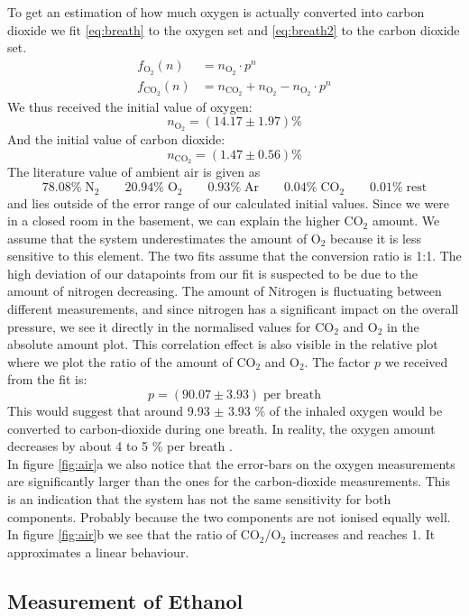     
    To get an estimation of how much oxygen is actually converted into carbon dioxide we fit \eqref{eq:breath} to the oxygen set and \eqref{eq:breath2} to the carbon dioxide set.
    \begin{align}
        f_{\text{O}_2}(n) &= n_{\text{O}_2} \cdot p^n \label{eq:breath}\\
        f_{\text{CO}_2}(n) &= n_{\text{CO}_2} +  n_{\text{O}_2} - n_{\text{O}_2} \cdot p^n \label{eq:breath2}
    \end{align}
    We thus received the initial value of oxygen:
    $$ n_{\text{O}_2} = (14.17 \pm 1.97) \%$$
    And the initial value of carbon dioxide:
    $$ n_{\text{CO}_2} = (1.47 \pm 0.56) \%$$
    The literature value of ambient air is given as \cite{air}
    $$ 78.08 \%\; \text{N}_2 \qquad 20.94 \%\; \text{O}_2 \qquad 0.93 \%\; \text{Ar} \qquad 0.04 \%\; \text{CO}_2 \qquad 0.01 \%\;\text{rest}$$
    and lies outside of the error range of our calculated initial values. Since we were in a closed room in the basement, we can explain the higher CO$_2$ amount. We assume that the system underestimates the amount of O$_2$ because it is less sensitive to this element.
    The two fits assume that the conversion ratio is 1:1. The high deviation of our datapoints from our fit is suspected to be due to the amount of nitrogen decreasing. The amount of Nitrogen is fluctuating between different measurements, and since nitrogen has a significant impact on the overall pressure, we see it directly in the normalised values for CO$_2$ and O$_2$ in the absolute amount plot. This correlation effect is also visible in  the relative plot where we plot the ratio of the amount of CO$_2$ and O$_2$. The factor $p$ we received from the fit is:
    $$p = (90.07 \pm 3.93) \;\text{per breath}$$
    This would suggest that around 9.93 $\pm$ 3.93 \% of the inhaled oxygen would be converted to carbon-dioxide during one breath.
    In reality, the oxygen amount decreases by about 4 to 5 \% per breath \cite{breath}.\\
    In figure \ref{fig:air}a we also notice that the error-bars on the oxygen measurements are significantly larger than the ones for the carbon-dioxide measurements. This is an indication that the system has not the same sensitivity for both components. Probably because the two components are not ionised equally well.
    In figure \ref{fig:air}b we see that the ratio of CO$_2$/O$_2$ increases and reaches 1. It approximates a linear behaviour.
    
    
    \subsection{Measurement of Ethanol}
    
